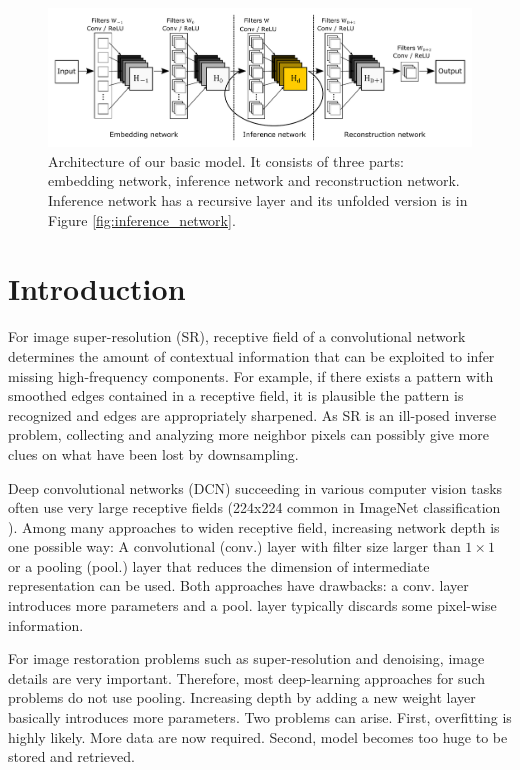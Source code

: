 \documentclass[10pt,twocolumn,letterpaper]{article}
\begin{document}
\begin{figure}[t]
	\includegraphics[width=\textwidth]{figs/f1}
	\caption {Architecture of our basic model. It consists of three parts: embedding network, inference network and reconstruction network. Inference network has a recursive layer and its unfolded version is in Figure \ref{fig:inference_network}.}
	\label{fig:overview}
\end{figure}


\section{Introduction}
For image super-resolution (SR), receptive field of a convolutional network determines the amount of contextual information that can be exploited to infer missing high-frequency components. For example, if there exists a pattern with smoothed edges contained in a receptive field, it is plausible the pattern is recognized and edges are appropriately sharpened. As SR is an ill-posed inverse problem, collecting and analyzing more neighbor pixels can possibly give more clues on what have been lost by downsampling. 

Deep convolutional networks (DCN) succeeding in various computer vision tasks often use very large receptive fields  (224x224 common in ImageNet classification \cite{krizhevsky2012imagenet, simonyan2015very}). Among many approaches to widen receptive field, increasing network depth is one possible way: A convolutional (conv.) layer  with filter size larger than $1\times 1$ or a pooling (pool.) layer that reduces the dimension of intermediate representation can be used.  Both approaches have drawbacks: a conv. layer introduces more parameters and a pool. layer typically discards some pixel-wise information. 

For image restoration problems such as super-resolution and denoising, image details are very important. Therefore, most deep-learning approaches for such problems do not use pooling. Increasing depth by adding a new weight layer basically introduces more parameters. Two problems can arise. First, overfitting is highly likely. More data are now required. Second, model becomes too huge to be stored and retrieved.
\end{document}

